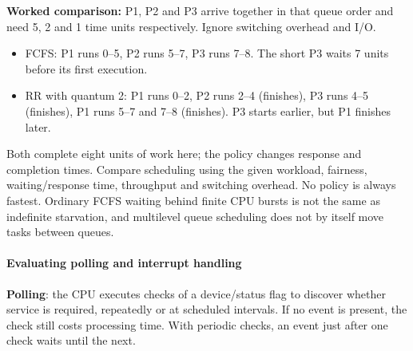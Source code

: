 \documentclass[a4paper,12pt]{article}
\begin{document}
\textbf{Worked comparison:} P1, P2 and P3 arrive together in that queue order and need 5, 2 and 1 time units respectively. Ignore switching overhead and I/O.
\begin{itemize}
    \item FCFS: P1 runs 0--5, P2 runs 5--7, P3 runs 7--8. The short P3 waits 7 units before its first execution.
    \item RR with quantum 2: P1 runs 0--2, P2 runs 2--4 (finishes), P3 runs 4--5 (finishes), P1 runs 5--7 and 7--8 (finishes). P3 starts earlier, but P1 finishes later.
\end{itemize}
Both complete eight units of work here; the policy changes response and completion times. Compare scheduling using the given workload, fairness, waiting/response time, throughput and switching overhead. No policy is always fastest. Ordinary FCFS waiting behind finite CPU bursts is not the same as indefinite starvation, and multilevel queue scheduling does not by itself move tasks between queues.

\paragraph{Evaluating polling and interrupt handling}
\textbf{Polling}: the CPU executes checks of a device/status flag to discover whether service is required, repeatedly or at scheduled intervals. If no event is present, the check still costs processing time. With periodic checks, an event just after one check waits until the next.
\end{document}
